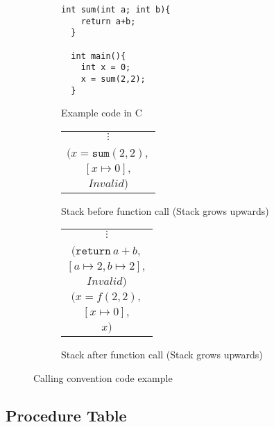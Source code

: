 \begin{figure}
  \begin{subfigure}{0.3\textwidth}
  \begin{lstlisting}[mathescape=true]
  int sum(int a; int b){
    return a+b;
  }

  int main(){
    int x = 0;
    x = sum(2,2);
  }
  \end{lstlisting}
  \caption{Example code in C}
  \label{fig:stack_ex_c_code}
  \end{subfigure}
  \begin{subfigure}{0.3\textwidth}
    \begin{tabular}{|c|}
      \hline
      \hline
      $\vdots$ \\
      \\
      \hline
      $(x = \mathtt{sum}(2,2),$ \\
      $[x \mapsto 0],$ \\
      $ Invalid )$ \\
      \hline \hline
    \end{tabular}
  \caption{Stack before function call (Stack grows upwards)}
  \label{fig:stack_bef_fun_call}
  \end{subfigure}
  \begin{subfigure}{0.3\textwidth}
    \begin{tabular}{|c|}
      \hline
      \hline
      $\vdots$ \\
      \\
      \hline
      $(\mathtt{return}\ a+b,$ \\
      $[a \mapsto 2, b \mapsto 2],$ \\
      $ Invalid )$ \\
      \hline
      $(x = f(2,2),$ \\
      $[x \mapsto 0],$ \\
      $ x )$ \\
      \hline \hline
    \end{tabular}
  \caption{Stack after function call (Stack grows upwards)}
  \label{fig:stack_aft_fun_call}
  \end{subfigure}

  \caption{Calling convention code example}
  \label{fig:stack_example}
\end{figure}


\subsection{Procedure Table}\label{subsection:procedure_table}

